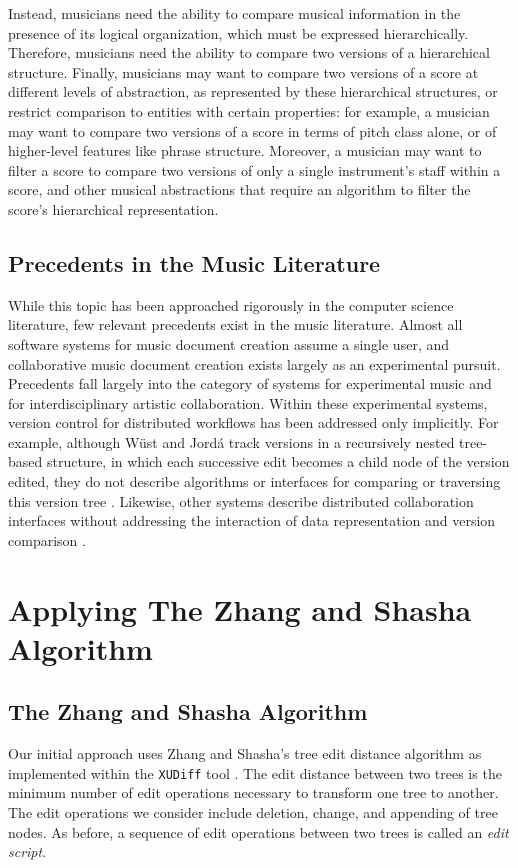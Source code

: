 \documentclass{article}
\begin{document}
Instead, musicians need the ability to compare musical information in
the presence of its logical organization, which must be expressed
hierarchically.  Therefore, musicians need the ability to compare two
versions of a hierarchical structure.  Finally, musicians may want to
compare two versions of a score at different levels of abstraction, as
represented by these hierarchical structures, or restrict comparison
to entities with certain properties: for example, a musician may want
to compare two versions of a score in terms of pitch class alone, or
of higher-level features like phrase structure. Moreover, a musician
may want to filter a score to compare two versions of only a single
instrument's staff within a score, and other musical abstractions that
require an algorithm to filter the score's hierarchical
representation.

\subsection{Precedents in the Music Literature}
While this topic has been approached rigorously in the computer science literature, few relevant precedents exist in the music literature. Almost all software systems for music document creation assume a single user, and collaborative music document creation exists largely as an experimental pursuit. Precedents fall largely into the category of systems for experimental music and for interdisciplinary artistic collaboration. Within these experimental systems, version control for distributed workflows has been addressed only implicitly. For example, although W\"{u}st and Jord\'{a} track versions in a recursively nested tree-based structure, in which each successive edit becomes a child node of the version edited, they do not describe algorithms or interfaces for comparing or traversing this version tree \cite{wust2001architectural}. Likewise, other systems describe distributed collaboration interfaces without addressing the interaction of data representation and version comparison \cite{Balachandran:2012cr,Hepting2005}.


\section{Applying The Zhang and Shasha Algorithm}
\subsection{The Zhang and Shasha Algorithm}
Our initial approach uses Zhang and Shasha's tree edit distance
algorithm as implemented within the \texttt{XUDiff} tool
\cite{Weaver:2013sl}.  The edit distance between two trees is the
minimum number of edit operations necessary to transform one tree to
another.  The edit operations we consider include deletion, change,
and appending of tree nodes.  As before, a sequence of edit operations
between two trees is called an \emph{edit script}.
\end{document}
